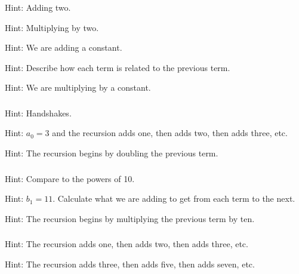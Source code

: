 \subsubsection*{ \answers}
\begin{apart}
    \item Hint: Adding two.
    \item Hint: Multiplying by two.
    \item Hint: We are adding a constant.
    \item Hint: Describe how each term is related to the previous term.
    \item Hint: We are multiplying by a constant.
\end{apart}

\subsubsection*{ \answers}
\begin{apart}
    \item Hint: Handshakes.
    \item Hint: $a_0=3$ and the recursion adds one, then adds two, then adds three, etc.
    \item Hint: The recursion begins by doubling the previous term.  
\end{apart}

\subsubsection*{ \answers}
\begin{apart}
    \item Hint: Compare to the powers of 10.
    \item Hint: $b_1=11$.  Calculate what we are adding to get from each term to the next.
    \item Hint: The recursion begins by multiplying the previous term by ten.  
\end{apart}

\subsubsection*{ \answers}
\begin{apart}
    \item Hint: The recursion adds one, then adds two, then adds three, etc.
    \item Hint: The recursion adds three, then adds five, then adds seven, etc.
\end{apart}

